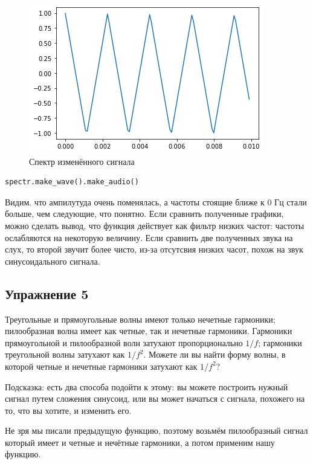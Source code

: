 \begin{figure}[H]
	\begin{center}
		\includegraphics[scale=1]{fig/lab02/lab2_9.png}
		\caption{Спектр изменённого сигнала}
	\end{center}
\end{figure}

\begin{lstlisting}[language=Python]
spectr.make_wave().make_audio()
\end{lstlisting}

Видим. что ампилутуда очень поменялась, а частоты стоящие ближе к 0 Гц стали больше, чем следующие, что понятно.
Если сравнить полученные графики, можно сделать вывод, что функция действует как фильтр низких частот: частоты ослабляются на некоторую величину. Если сравнить две полученных звука на слух, то второй звучит более чисто, из-за отсутсвия низких часот, похож на звук синусоидального сигнала.

\subsection{Упражнение 5}

Треугольные и прямоугольные волны имеют только нечетные гармоники; пилообразная волна имеет как четные, так и нечетные гармоники. Гармоники прямоугольной и пилообразной волн затухают пропорционально $1/f$; гармоники треугольной волны затухают как $1/f^2$. Можете ли вы найти форму волны, в которой четные и нечетные гармоники затухают как $1/f^2$?

\noindent Подсказка: есть два способа подойти к этому: вы можете построить нужный сигнал путем сложения синусоид, или вы может начаться с сигнала, похожего на то, что вы хотите, и изменить его.


\noindent Не зря мы писали предыдущую функцию, поэтому возьмём пилообразный сигнал который имеет и четные и нечётные гармоники, а потом применим нашу функцию.

